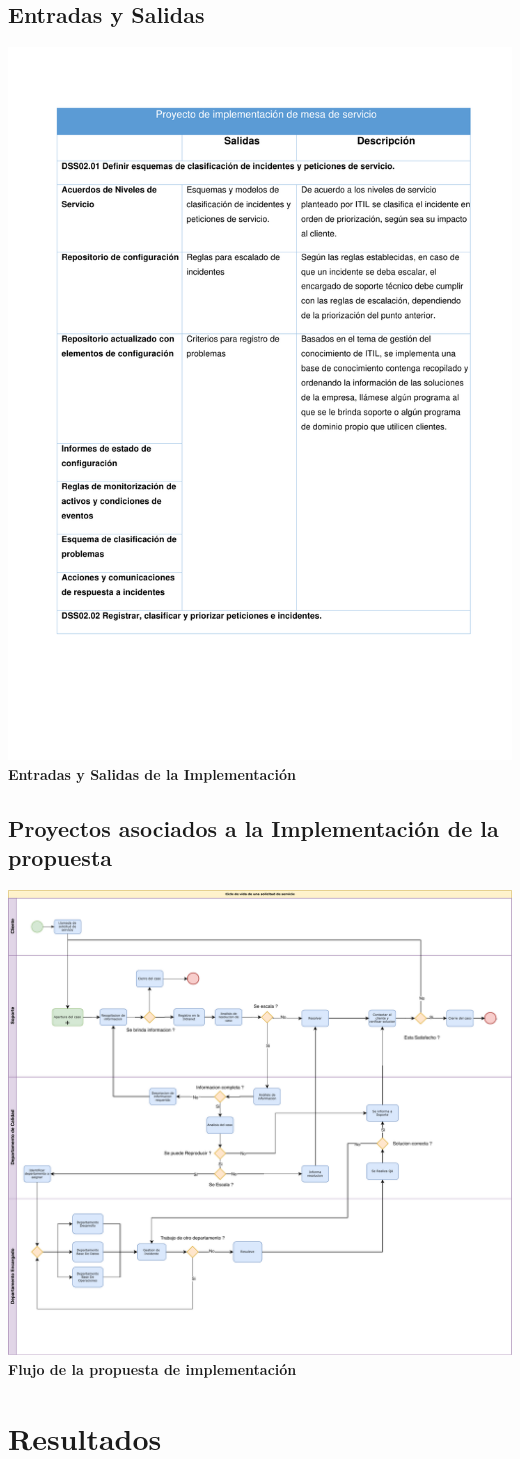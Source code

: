 \documentclass[conference]{IEEEtran}
\begin{document}
\subsection{Entradas y Salidas}
        \begin{center}
            \includegraphics[width=.5\textwidth]{Documentos/Entradas y Salidas.pdf}
            \textbf {Entradas y Salidas de la Implementación}
        \end{center}
        
\subsection{Proyectos asociados a la Implementación de la propuesta}
        \begin{center}
            \includegraphics[width=.4\textwidth]{Documentos/Flujo proceso.pdf}\\
            \textbf {Flujo de la propuesta de implementación}
        \end{center}
\newpage
\section{Resultados}
\end{document}
